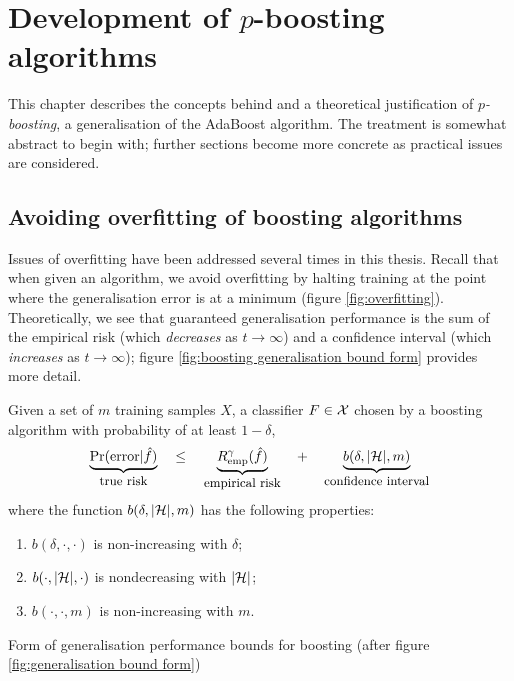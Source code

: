 
\chapter{Development of $p$-boosting algorithms}
\label{chapter:pboosting}

This chapter describes the concepts behind and a theoretical
justification of \emph{$p$-boosting}, a generalisation of the AdaBoost
algorithm.  The treatment is somewhat abstract to begin with; further
sections become more concrete as practical issues are considered.

\section{Avoiding overfitting of boosting algorithms}

Issues of overfitting have been addressed several times in this
thesis.  Recall that when given an algorithm, we avoid overfitting by
halting training at the point where the generalisation error is at a
minimum (figure \ref{fig:overfitting}).  Theoretically, we see that
guaranteed generalisation performance is the sum of the empirical risk
(which \emph{decreases} as $t \rightarrow \infty$) and a confidence
interval (which \emph{increases} as $t \rightarrow \infty$); figure
\ref{fig:boosting generalisation bound form} provides more detail.

\begin{linefigure}
Given a set of $m$ training samples $X$, a classifier $F \in \mathcal{X}$
chosen by a boosting algorithm  with probability of at least $1 - \delta$,
%
\begin{equation}
\underbrace{\Pr(\mathrm{error}|\hat{f})}_{\mbox{\small{true risk}}}
\quad \leq \quad
\underbrace{R_{\mathrm{emp}}^{\gamma}(\hat{f})}_{\mbox{\small{empirical risk}}}
\quad + \quad
\underbrace{b(\delta, |\mathcal{H}|, m)}_{\mbox{\small{confidence interval}}}
\label{eqn:boosting general bound}
\end{equation}
%
where the function $b(\delta, |\mathcal{H}|, m)$ has the following
properties:
\begin{enumerate}
\item	$b(\delta, \cdot, \cdot)$ is non-increasing with $\delta$;
\item	$b(\cdot, |\mathcal{H}|, \cdot)$ is nondecreasing with $|\mathcal{H}|$;
\item	$b(\cdot, \cdot, m)$ is non-increasing with $m$.
\end{enumerate}
\caption{Form of generalisation performance bounds for boosting (after
figure \ref{fig:generalisation bound form})}
\label{fig:boosting generalisation bound form}
\end{linefigure}

